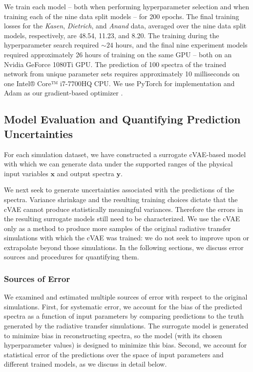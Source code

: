 \documentclass[fleqn,usenatbib,useAMS]{mnras}
\begin{document}
We train each model -- both when performing hyperparameter selection and when training each of the nine data split models -- for 200 epochs. 
The final training losses for the \emph{Kasen}, \emph{Dietrich}, and \emph{Anand} data, averaged over the nine data split models, respectively, are 48.54, 11.23, and 8.20.
The training during the hyperparameter search required $\sim24$ hours, and the final nine experiment models required approximately 26 hours of training on the same GPU -- both on an Nvidia GeForce 1080Ti GPU.
The prediction of 100 spectra of the trained network from unique parameter sets requires approximately 10 milliseconds on one Intel® Core™ i7-7700HQ CPU. 
We use PyTorch for implementation \citep{paszkePyTorchImperativeStyle2019} and Adam as our gradient-based optimizer \citep{kingmaAdamMethodStochastic2017}.



\subsection{Model Evaluation and Quantifying Prediction Uncertainties}
\label{sec:err_analysis}

For each simulation dataset, we have constructed a surrogate cVAE-based model with which we can generate data under the supported ranges of the physical input variables $\mathbf{x}$ and output spectra $\mathbf{y}$.

We next seek to generate uncertainties associated with the predictions of the spectra.
Variance shrinkage and the resulting training choices dictate that the cVAE cannot produce statistically meaningful variances. 
Therefore the errors in the resulting surrogate models still need to be characterized.
We use the cVAE only as a method to produce more samples of the original radiative transfer simulations with which the cVAE was trained: we do not seek to improve upon or extrapolate beyond those simulations.
In the following sections, we discuss error sources and procedures for quantifying them.

\subsubsection{Sources of Error}

We examined and estimated multiple sources of error with respect to the original simulations.
First, for systematic error, we account for the bias of the predicted spectra as a function of input parameters by comparing predictions to the truth generated by the radiative transfer simulations.
The surrogate model is generated to minimize bias in reconstructing spectra, so the model (with its chosen hyperparameter values) is designed to minimize this bias.
Second, we account for statistical error of the predictions over the space of input parameters and different trained models, as we discuss in detail below.
\end{document}
